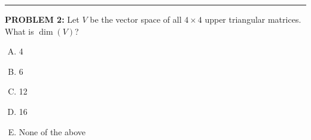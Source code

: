\documentclass[12pt]{amsart}
\newcommand{\divider}{
  \vspace{-1em} %
  \noindent
  \raisebox{-0.15ex}{\textbullet}%
  \hspace{0.5em}%
  \rule[0.5ex]{0.95\textwidth}{1.0pt}%
  \hspace{0.5em}%
  \raisebox{-0.15ex}{\textbullet}%
  \vspace{0em} %
}
\begin{document}

\divider



{\bf PROBLEM 2:}
% 
Let $V$ be the vector space of all $4 \times 4$ upper triangular matrices. What is $\dim(V)$?

\begin{enumerate}[(A)]
\item 4
\item 6
\item 12
\item 16
\item None of the above
\end{enumerate}

\end{document}
